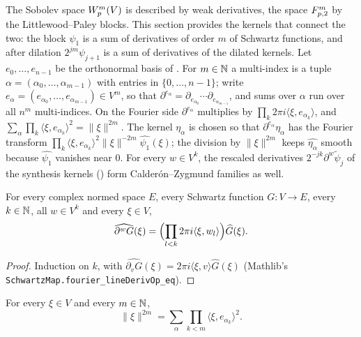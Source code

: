 The Sobolev space $W^{m}_{p}(V)$ is described by weak derivatives, the space $F^{m}_{p,2}$ by the
Littlewood--Paley blocks. This section provides the kernels that connect the two: the block
$\psi_1$ is a sum of derivatives of order $m$ of Schwartz functions, and after dilation
$2^{jm} \psi_{j+1}$ is a sum of derivatives of the dilated kernels. Let $e_0, \dots, e_{n-1}$ be
the orthonormal basis of . For $m \in \mathbb{N}$ a multi-index is a tuple
$\alpha = (\alpha_0, \dots, \alpha_{m-1})$ with entries in $\{0, \dots, n-1\}$; write
$e_\alpha = (e_{\alpha_0}, \dots, e_{\alpha_{m-1}}) \in V^m$, so that
$\partial^{e_\alpha} = \partial_{e_{\alpha_0}} \cdots \partial_{e_{\alpha_{m-1}}}$, and sums over
$\alpha$ run over all $n^m$ multi-indices. On the Fourier side $\partial^{e_\alpha}$ multiplies by
$\prod_k 2\pi i \langle \xi, e_{\alpha_k} \rangle$, and
$\sum_\alpha \prod_k \langle \xi, e_{\alpha_k} \rangle^2 = \|\xi\|^{2m}$. The kernel $\eta_\alpha$
is chosen so that $\partial^{e_\alpha} \eta_\alpha$ has the Fourier transform
$\prod_k \langle \xi, e_{\alpha_k} \rangle^2 \|\xi\|^{-2m} \widehat{\psi_1}(\xi)$; the division by
$\|\xi\|^{2m}$ keeps $\widehat{\eta_\alpha}$ smooth because $\widehat{\psi_1}$ vanishes near $0$.
For every $w \in V^k$, the rescaled derivatives $2^{-jk} \partial^w \tilde\psi_j$ of the synthesis
kernels () form Calder\'on--Zygmund families as well.

\begin{lemma}
\label{lem:fourier-iterated-derivative}
\leanok
For every complex normed space $E$, every Schwartz function $G \colon V \to E$, every $k \in \mathbb{N}$,
all $w \in V^k$ and every $\xi \in V$,
\[
  \widehat{\partial^w G}(\xi) = \Bigl( \prod_{l < k} 2\pi i \langle \xi, w_l \rangle \Bigr)
  \widehat G(\xi) .
\]
\end{lemma}

\begin{proof}
\leanok
Induction on $k$, with $\widehat{\partial_v G}(\xi) = 2\pi i \langle \xi, v \rangle \widehat G(\xi)$
(Mathlib's \texttt{SchwartzMap.\allowbreak fourier\_\allowbreak lineDerivOp\_\allowbreak eq}).
\end{proof}

\begin{lemma}
\label{lem:norm-power-coordinates}
\leanok
{}
For every $\xi \in V$ and every $m \in \mathbb{N}$,
\[
  \|\xi\|^{2m} = \sum_\alpha \prod_{k < m} \langle \xi, e_{\alpha_k} \rangle^2 .
\]
\end{lemma}

